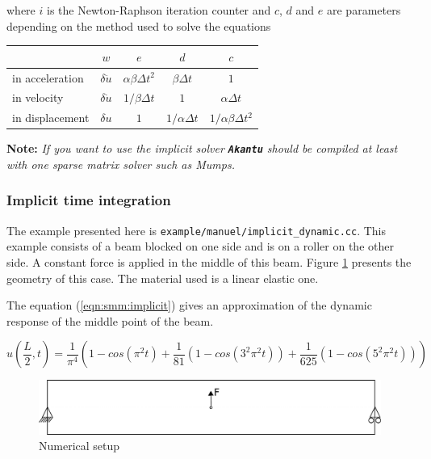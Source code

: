 \documentclass[a4paper,11pt]{book}
\newcommand{\akantu}{\texttt{\textbf{Akantu}}\xspace}
\newcommand{\code}[1]{\texttt{#1}}
\newcommand{\note}[1]{\textbf{Note: }\textit{#1}}
\begin{document}
where  $i$ is  the Newton-Raphson  iteration counter  and $c$,  $d$ and  $e$ are
parameters depending on the method used to solve the equations

\begin{center}
  \begin{tabular}{l|c|c|c|c}
    & $w$ & $e$ & $d$ & $c$\\
    \hline
    in  acceleration &$  \delta \ddot{u}$  & $\alpha  \beta \Delta  t^2$ &$\beta
    \Delta t$ &$1$\\
    in velocity &  $ \delta \dot{u}$& $1/\beta \Delta t$ &  $1$ & $\alpha \Delta
    t$\\
    in displacement &$\delta  u$ & $ 1$ & $1/\alpha \Delta  t$ & $1/\alpha \beta
    \Delta t^2$
  \end{tabular}
\end{center}

\note{If you want to use the implicit solver \akantu should be compiled at
  least with one sparse matrix solver such as Mumps\cite{mumps}.}


\subsubsection{Implicit time integration}
The example  presented here is  \code{example/manuel/implicit\_dynamic.cc}. This
example consists of a  beam blocked on one side and is on  a roller on the other
side.   A  constant  force is  applied  in  the  middle  of this  beam.   Figure
\ref{fig:smm:implicit:dynamic} presents the geometry  of this case. The material
used is a linear elastic one.

The  equation (\ref{eqn:smm:implicit})  gives  an approximation  of the  dynamic
response of the middle point of the beam.

\begin{equation}\label{eqn:smm:implicit}
  u(\frac{L}{2}, t) = \frac{1}{\pi^4} (1 - cos(\pi^2 t) +
  \frac{1}{81}(1 - cos(3^2 \pi^2 t)) +
  \frac{1}{625}(1 - cos(5^2 \pi^2 t)))
\end{equation}


\begin{figure}[!htb]
  \centering
  \includegraphics[scale=.6]{figures/implicit_dynamic}
  \caption{Numerical setup}
  \label{fig:smm:implicit:dynamic}
\end{figure}
\end{document}

